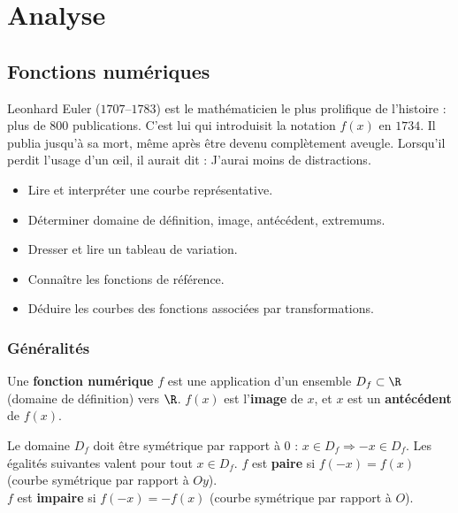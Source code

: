 \part{Analyse}

\chapter{Fonctions num\'eriques}


\begin{anecdote}
Leonhard Euler ($1707$--$1783$) est le math\'ematicien le plus prolifique
de l'histoire : plus de $800$ publications. C'est lui qui introduisit la
notation $f(x)$ en $1734$. Il publia jusqu'\`a sa mort, m\^{e}me apr\`es \^{e}tre
devenu compl\`etement aveugle. Lorsqu'il perdit l'usage d'un \oe il, il aurait
dit : \og J'aurai moins de distractions.\fg
\end{anecdote}

\begin{objectifs}
\begin{itemize}
  \item Lire et interpr\'eter une courbe repr\'esentative.
  \item D\'eterminer domaine de d\'efinition, image, ant\'ec\'edent, extremums.
  \item Dresser et lire un tableau de variation.
  \item Conna\^itre les fonctions de r\'ef\'erence.
  \item D\'eduire les courbes des fonctions associ\'ees par transformations.
\end{itemize}
\end{objectifs}

\section{G\'en\'eralit\'es}

\begin{defn}
Une \textbf{fonction num\'erique} $f$ est une application d'un ensemble $D_f \subset \R$
(domaine de d\'efinition) vers $\R$. $f(x)$ est l'\textbf{image} de $x$,
et $x$ est un \textbf{ant\'ec\'edent} de $f(x)$.
\end{defn}

\begin{defn}[Parit\'e]
Le domaine $D_f$ doit \^etre sym\'etrique par rapport \`a $0$ :
$x\in D_f\Rightarrow -x\in D_f$. Les \'egalit\'es suivantes valent pour tout $x\in D_f$.
$f$ est \textbf{paire} si $f(-x)=f(x)$ (courbe sym\'etrique par rapport \`a $Oy$).\\
$f$ est \textbf{impaire} si $f(-x)=-f(x)$ (courbe sym\'etrique par rapport \`a $O$).
\end{defn}

